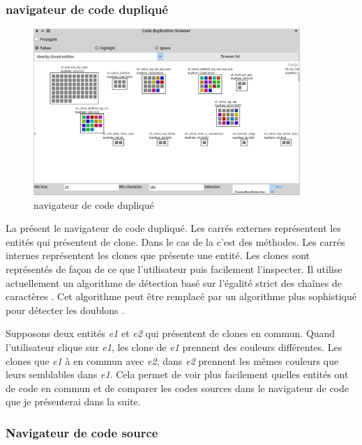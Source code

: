 \documentclass[a4paper]{article}
\begin{document}
\subsubsection{navigateur de code dupliqué}
\begin{figure}[htbp]
  \begin{center}
  \includegraphics[width=0.9\textwidth]{./figures/duplicationBrowser.png}
  \caption{navigateur de code dupliqué}
  \label{fig:duplicationBrowser}
\end{center}
\vspace{-0.3cm}
\end{figure}
La  présent le navigateur de code dupliqué. Les carrés externes représentent les entités qui présentent de clone.
Dans le cas de la  c'est des méthodes. 
Les carrés internes représentent les clones que présente une entité.
Les clones sont représentés de façon de ce que l'utilisateur puis facilement l'inspecter.
Il utilise actuellement un algorithme de détection basé sur l'égalité strict des chaînes de caractères \citep{Duca99b}. 
Cet algorithme peut être remplacé par un algorithme plus sophistiqué pour détecter les doublons \citep{Roy07a}. 

Supposons deux entités \textit{e1} et \textit{e2} qui présentent de clones en commun.
Quand l'utilisateur clique sur \textit{e1}, les clone de \textit{e1} prennent des couleurs différentes.
Les clones que \textit{e1} à en commun avec \textit{e2}, dans \textit{e2} prennent les mêmes couleurs que leurs semblables dans \textit{e1}.
Cela permet de voir plus facilement quelles entités ont de code en commun et de comparer les codes sources dans le navigateur de code que je présenterai dans la suite. 
\subsubsection{Navigateur de code source}
\end{document}
